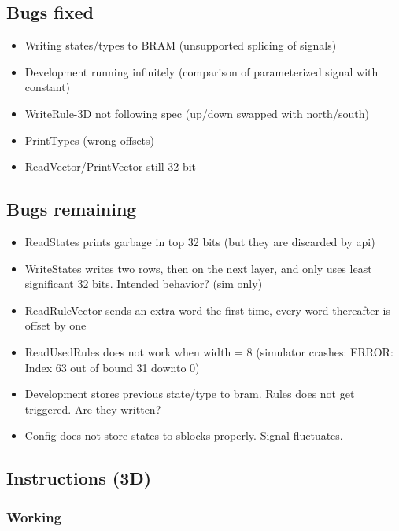 \subsection{Bugs fixed}

\begin{itemize}
    \item Writing states/types to BRAM (unsupported splicing of signals)
    \item Development running infinitely (comparison of parameterized signal with constant)
    \item WriteRule-3D not following spec (up/down swapped with north/south)
    \item PrintTypes (wrong offsets)
    \item ReadVector/PrintVector still 32-bit
\end{itemize}

\subsection{Bugs remaining}

\begin{itemize}
    \item ReadStates prints garbage in top 32 bits (but they are discarded by api)
    \item WriteStates writes two rows, then on the next layer, and only uses least significant 32 bits. Intended behavior? (sim only)
    \item ReadRuleVector sends an extra word the first time, every word thereafter is offset by one
    \item ReadUsedRules does not work when width = 8 (simulator crashes: ERROR: Index 63 out of bound 31 downto 0)
    \item Development stores previous state/type to bram. Rules does not get triggered. Are they written?
    \item Config does not store states to sblocks properly. Signal fluctuates.
\end{itemize}

\subsection{Instructions (3D)}

\subsubsection{Working}


